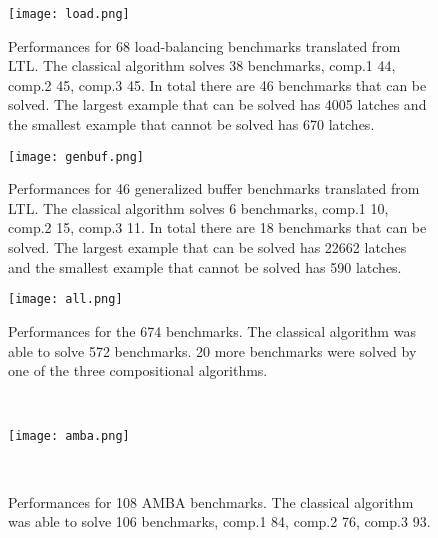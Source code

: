 \documentclass[submission,copyright,creativecommons]{eptcs}
\begin{document}
\begin{figure}[H]
  \begin{minipage}{0.49\textwidth}
    \begin{center}
      \texttt{[image: load.png]}
      \caption{{Performances for 68 load-balancing benchmarks translated from LTL.
        The classical algorithm solves 38 benchmarks, comp.1 44, comp.2 45, comp.3 45.
        In total there are 46 benchmarks that can be solved. The largest example that can be solved has 4005 latches and the smallest example that cannot be solved has 670 latches.}
      }
      \label{fig:load}
    \end{center}
  \end{minipage}
  \begin{minipage}{0.49\textwidth}
    \begin{center}
      \texttt{[image: genbuf.png]}
      \caption{{Performances for 46 generalized buffer benchmarks translated from LTL.
        The classical algorithm solves 6 benchmarks, comp.1 10, comp.2 15, comp.3 11.
        In total there are 18 benchmarks that can be solved. The largest example that can be solved has 22662 latches and the smallest example that cannot be solved has 590 latches.}
      }
      \label{fig:gb}
    \end{center}
  \end{minipage}
  \begin{minipage}{0.49\textwidth}
    \begin{center}
      \texttt{[image: all.png]}
      \caption{{Performances for the 674 benchmarks.
        The classical algorithm was able to solve 572 benchmarks.
        20 more benchmarks were solved by one of the three compositional algorithms.}
      }
      \label{fig:best}
    \end{center}
  \end{minipage}~\hfill~\begin{minipage}{0.49\textwidth}
    \begin{center}
      \texttt{[image: amba.png]}
	\caption{{Performances for 108 AMBA benchmarks.
          The classical algorithm was able to solve 106 benchmarks, comp.1 84, comp.2 76, comp.3 93.}}
	\label{fig:amba}
    \end{center}
  \end{minipage}\\
\end{figure}



\end{document}
